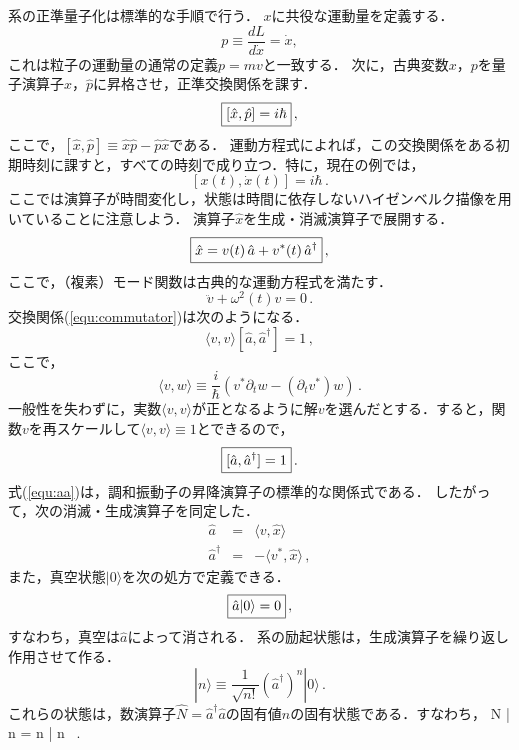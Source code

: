 系の正準量子化は標準的な手順で行う．
$x$に共役な運動量を定義する．
\begin{equation}
p \equiv \frac{d L}{d \dot{x}} = \dot{x},
\end{equation}
これは粒子の運動量の通常の定義$p=mv$と一致する．
次に，古典変数$x$，$p$を量子演算子$\hat{x}$，$\hat{p}$に昇格させ，正準交換関係を課す．
\begin{equation}
\label{equ:commutator}
\fbox{$\displaystyle
\left[\hat{x}, \hat{p} \right] = i \hbar $}\, ,
\end{equation}
ここで，$[\hat x, \hat p] \equiv \hat x \hat p - \hat p \hat x$である．
運動方程式によれば，この交換関係をある初期時刻に課すと，すべての時刻で成り立つ．特に，現在の例では，
\begin{equation}
\left[x(t), \dot{x}(t) \right] = i \hbar\, .
\end{equation}
ここでは演算子が時間変化し，状態は時間に依存しないハイゼンベルク描像を用いていることに注意しよう．
演算子$\hat x$を生成・消滅演算子で展開する．
\begin{equation}
\fbox{$\displaystyle
\hat{x} = v(t) \, \hat{a} + v^*(t) \, \hat{a}^\dagger $}\, ,
\end{equation}
ここで，（複素）モード関数は古典的な運動方程式を満たす．
\begin{equation}
\label{equ:veqn}
\ddot{v}+\omega^2(t) v =0\, .
\end{equation}
交換関係(\ref{equ:commutator})は次のようになる．
\begin{equation}
\langle v,v \rangle [\hat{a}, \hat{a}^\dagger ]= 1\, ,
\end{equation}
ここで，
\begin{equation}
\langle v,w \rangle \equiv \frac{i}{\hbar} \left(v^* \partial_t w - (\partial_t v^*) w \right)\, .
\end{equation}
一般性を失わずに，実数$\langle v,v \rangle$が正となるように解$v$を選んだとする．すると，関数$v$を再スケールして$\langle v,v \rangle \equiv 1$とできるので，
\begin{equation}
\label{equ:aa}
\fbox{$\displaystyle [\hat{a}, \hat{a}^\dagger ]=1$}\, .
\end{equation}
式(\ref{equ:aa})は，調和振動子の昇降演算子の標準的な関係式である．
したがって，次の消滅・生成演算子を同定した．
\begin{eqnarray}
\hat{a} &=& \langle v, \hat{x} \rangle\\
\hat{a}^\dagger &=& -\langle v^*, \hat{x} \rangle\, ,
\end{eqnarray} 
また，真空状態$| 0 \rangle$を次の処方で定義できる．
\begin{equation}
\fbox{$\displaystyle \hat{a} | 0 \rangle = 0$}\, ,
\end{equation}
すなわち，真空は$\hat a$によって消される．
系の励起状態は，生成演算子を繰り返し作用させて作る．
\begin{equation}
| n \rangle \equiv \frac{1}{\sqrt{n!}} (\hat{a}^\dagger)^n | 0 \rangle\, .
\end{equation}
これらの状態は，数演算子$\hat{N} = \hat{a}^\dagger \hat{a}$の固有値$n$の固有状態である．すなわち，
\beq
\hat N | n \rangle = n | n \rangle\, .
\eeq


